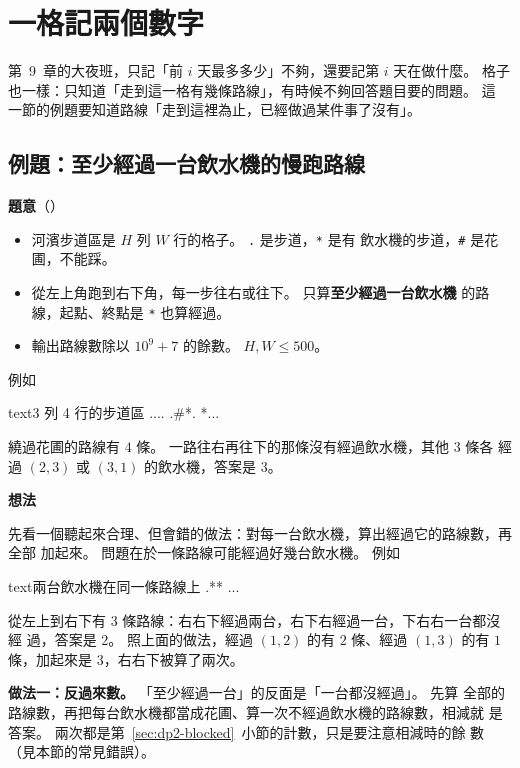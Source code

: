 \section{一格記兩個數字}
\label{sec:dp2-states}

第~9~章的大夜班，只記「前 $i$ 天最多多少」不夠，還要記第 $i$ 天在做什麼。
格子也一樣：只知道「走到這一格有幾條路線」，有時候不夠回答題目要的問題。 這
一節的例題要知道路線「走到這裡為止，已經做過某件事了沒有」。

\subsection{例題：至少經過一台飲水機的慢跑路線}
\label{sec:dp2-ex-fountain}

\textbf{題意}（）

\begin{itemize}
\item 河濱步道區是 $H$ 列 $W$ 行的格子。 \texttt{.} 是步道，\texttt{*} 是有
飲水機的步道，\texttt{\#} 是花圃，不能踩。
\item 從左上角跑到右下角，每一步往右或往下。 只算\textbf{至少經過一台飲水機}
的路線，起點、終點是 \texttt{*} 也算經過。
\item 輸出路線數除以 $10^9 + 7$ 的餘數。 $H, W \le 500$。
\end{itemize}

例如
\begin{code}{text}{3 列 4 行的步道區}
....
.#*.
*...
\end{code}
繞過花圃的路線有 $4$ 條。 一路往右再往下的那條沒有經過飲水機，其他 $3$ 條各
經過 $(2, 3)$ 或 $(3, 1)$ 的飲水機，答案是 $3$。

\textbf{想法}

先看一個聽起來合理、但會錯的做法：對每一台飲水機，算出經過它的路線數，再全部
加起來。 問題在於一條路線可能經過好幾台飲水機。 例如
\begin{code}{text}{兩台飲水機在同一條路線上}
.**
...
\end{code}
從左上到右下有 $3$ 條路線：右右下經過兩台，右下右經過一台，下右右一台都沒經
過，答案是 $2$。 照上面的做法，經過 $(1, 2)$ 的有 $2$ 條、經過 $(1, 3)$ 的有
$1$ 條，加起來是 $3$，右右下被算了兩次。

\textbf{做法一：反過來數。} 「至少經過一台」的反面是「一台都沒經過」。 先算
全部的路線數，再把每台飲水機都當成花圃、算一次不經過飲水機的路線數，相減就
是答案。 兩次都是第~\ref{sec:dp2-blocked}~小節的計數，只是要注意相減時的餘
數（見本節的常見錯誤）。

